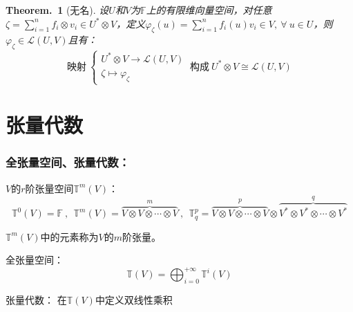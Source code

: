 \documentclass[zihao=5,UTF8]{report}
\def\F{\mathbb{F}}
\def\T{\mathbb{T}}
\theoremstyle{mystyle} %
\newtheorem{theorem}{Theorem.\,}
\begin{document}
\begin{theorem}[无名]\label{无名}
设$U$和$V$为$\F$上的有限维向量空间，对任意$\zeta = \sum_{i=1}^{n}f_i\otimes v_i \in U^*\otimes V $，定义$\varphi_{\zeta}(u) = \sum_{i=1}^{n}f_i(u)v_i \in V,\ \forall\ u\in U$，则$\varphi_{\zeta} \in \mathscr{L}(U,V)$且有：
\begin{equation*}
    \text{映射}\ \begin{cases}
        U^*\otimes V \longrightarrow \mathscr{L}(U,V)\\
        \zeta \longmapsto \varphi_{\zeta}
    \end{cases} \ \text{构成}\ U^*\otimes V \cong \mathscr{L}(U,V)
\end{equation*}


\section{张量代数}

\end{theorem}

\subsubsection{全张量空间、张量代数：}

$V$的$r$阶张量空间$\T^m(V)$：
\begin{equation*}
    \T^0(V) = \mathbb{F}\ ,\ \  \T^m(V) = \overset{m}{\overbrace{V\otimes V \otimes \cdots \otimes V}}\ ,\ \ \T^p_q = \overset{p}{\overbrace{V\otimes V \otimes \cdots \otimes V}}\otimes \overset{q}{\overbrace{V^*\otimes V^* \otimes \cdots \otimes V^*}}
\end{equation*}
{\par\color{gray}\small
$\T^m(V)$中的元素称为$V$的$m$阶张量。
\par}

全张量空间：
\begin{equation*}
    \T(V) = \bigoplus^{+\infty}_{i=0} \T^i(V)
\end{equation*}

张量代数：
在$\T(V)$中定义双线性乘积
\end{document}
